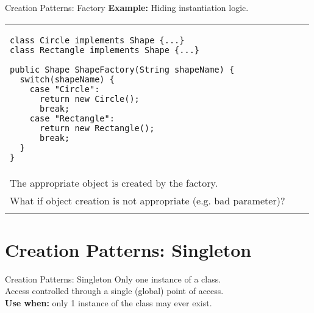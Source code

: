 \documentclass[14pt,aspectratio=169]{beamer}
\makeatletter
\newenvironment{splitslide}
{
\centering
\begin{tabular}{@{}p{0.50\textwidth} | p{0.025\textwidth}@{} p{0.4\textwidth}@{}}
}
{
\end{tabular}
}
\makeatother
\begin{document}
\begin{frame}[fragile]{Creation Patterns: Factory}
\normalsize
\textbf{Example:} Hiding instantiation logic.
\vspace{1em}
\begin{splitslide}
\begin{Verbatim}[fontsize=\scriptsize]
class Circle implements Shape {...}
class Rectangle implements Shape {...}

public Shape ShapeFactory(String shapeName) {
  switch(shapeName) {
    case "Circle":
      return new Circle();
      break;
    case "Rectangle":
      return new Rectangle();
      break;
  }
}
\end{Verbatim}

&&

\begin{footnotesize}
\raggedright
The client code does not need to implement potentially complex instantiation logic. \\
\vspace{1em}
The appropriate object is created by the factory. \\
\vspace{1em}
What if object creation is not appropriate (e.g. bad parameter)? \\
\end{footnotesize}
\vspace{1em}
\begin{tiny}
derived from: \url{http://www.tutorialspoint.com/design_pattern/factory_pattern.htm}
\end{tiny}
\end{splitslide}
\end{frame}



\section*{Creation Patterns: Singleton}



\begin{frame}{Creation Patterns: Singleton}
Only one instance of a class. \\
\vspace{1em}
Access controlled through a single (global) point of access.\\
\vspace{1em}
\textbf{Use when:} only 1 instance of the class may ever exist.
\end{frame}
\end{document}
